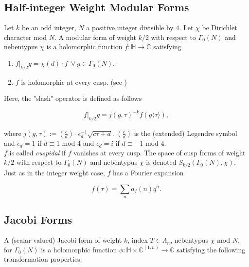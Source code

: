 \documentclass[11pt]{article}
\theoremstyle{definition}
\theoremstyle{remark}
\newcommand{\C}{\mathbb{C}}
\newcommand{\h}{\mathbb{H}}
\begin{document}
\subsection{Half-integer Weight Modular Forms}

Let $k$ be an odd integer, $N$ a positive integer divisible by $4$. Let $\chi$ be Dirichlet character mod $N$. A modular form of weight $k/2$ with respect to $\Gamma_0(N)$ and nebentypus $\chi$ is a holomorphic function $f:\h \to \C$ satisfying \\

\begin{enumerate}
    \item $f \vert_{k/2} g = \chi(d) \cdot f \ \ \forall \ g \in \Gamma_0(N)$.
    \item $f$ is holomorphic at every cusp. (see \cite{koblitz})
\end{enumerate}

Here, the "slash" operator is defined as follows

\[
f \vert_{k/2}g = j(g,\tau)^{-k} f(g \langle \tau \rangle),
\]

where $j(g,\tau) := \left( \frac{c}{d} \right) \cdot \epsilon_d^{-1} \sqrt{c\tau+d}$. $\left( \frac{c}{d} \right)$ is the (extended) Legendre symbol and $\epsilon_d = 1$ if $d \equiv 1$ mod $4$ and $\epsilon_d = i$ if $d \equiv -1$ mod $4$. \\

$f$ is called \textit{cuspidal} if $f$ vanishes at every cusp. The space of cusp forms of weight $k/2$ with respect to $\Gamma_0(N)$ and nebentypus $\chi$ is denoted $S_{k/2}(\Gamma_0(N), \chi)$. Just as in the integer weight case, $f$ has a Fourier expansion 

\[
f(\tau) = \sum_{n} a_f(n) q^n.
\]

\subsection{Jacobi Forms}

A (scalar-valued) Jacobi form of weight $k$, index $T \in \Lambda_n$, nebentypus $\chi$ mod $N$, for $\Gamma_0(N)$ is a holomorphic function $\phi:\h \times \C^{(1,n)} \to \C$ satisfying the following transformation properties:
\end{document}
